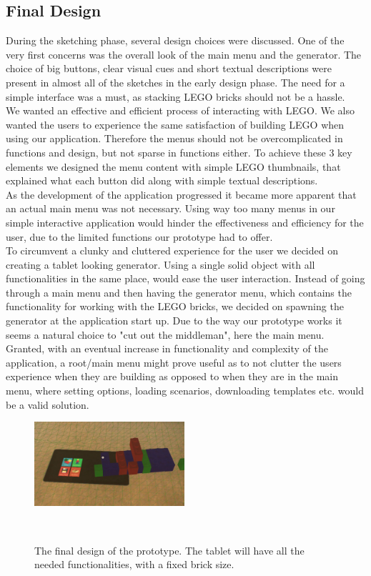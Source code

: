\subsection{Final Design}
During the sketching phase, several design choices were discussed. One of the very first concerns was the overall look of the main menu and the generator. The choice of big buttons, clear visual cues and short textual descriptions were present in almost all of the sketches in the early design phase. The need for a simple interface was a must, as stacking LEGO bricks should not be a hassle. \\
We wanted an effective and efficient process of interacting with LEGO. We also wanted the users to experience the same satisfaction of building LEGO when using our application. Therefore the menus should not be overcomplicated in functions and design, but not sparse in functions either. To achieve these 3 key elements we designed the menu content with simple LEGO thumbnails, that explained what each button did along with simple textual descriptions. \\
As the development of the application progressed it became more  apparent that an actual main menu was not necessary. Using way too many menus in our simple interactive application would hinder the effectiveness and efficiency for the user, due to the limited functions our prototype had to offer. \\
To circumvent a clunky and cluttered experience for the user we decided on creating a tablet looking generator. Using a single solid object with all functionalities in the same place, would ease the user interaction. Instead of going through a main menu and then having the generator menu, which contains the functionality for working with the LEGO bricks, we decided on spawning the generator at the application start up. Due to the way our prototype works it seems a natural choice to "cut out the middleman", here the main menu.  \\ 
Granted, with an eventual increase in functionality and complexity of the application, a root/main menu might prove useful as to not clutter the users experience when they are building as opposed to when they are in the main menu, where setting options, loading scenarios, downloading templates etc. would be a valid solution.\\
\begin{figure}[t]
	\centering
	\includegraphics[width=210px]{figures/finaldesign.jpg}
	\caption{The final design of the prototype. The tablet will have all the needed functionalities, with a fixed brick size.}~\label{fig:finaldesign}
\end{figure}

